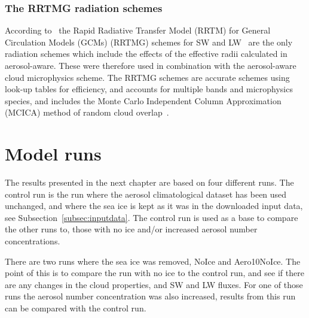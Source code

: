\subsubsection{The RRTMG radiation schemes}
According to~\citet{Thompson2014} the Rapid Radiative Transfer Model (RRTM) for General Circulation Models (GCMs) (RRTMG) schemes for SW and LW~\citep{Mlawer1997, Iacono2000, Iacono2003, Iacono2008} are the only radiation schemes which include the effects of the effective radii calculated in aerosol-aware. These were therefore used in combination with the aerosol-aware cloud microphysics scheme. The RRTMG schemes are accurate schemes using look-up tables for efficiency, and accounts for multiple bands and microphysics species, and includes the Monte Carlo Independent Column Approximation (MCICA) method of random cloud overlap~\citep{Wang2015}.

\section{Model runs}
The results presented in the next chapter are based on four different runs. The control run is the run where the aerosol climatological dataset has been used unchanged, and where the sea ice is kept as it was in the downloaded input data, see Subsection~\ref{subsec:inputdata}. The control run is used as a base to compare the other runs to, those with no ice and/or increased aerosol number concentrations.

There are two runs where the sea ice was removed, NoIce and Aero10NoIce. The point of this is to compare the run with no ice to the control run, and see if there are any changes in the cloud properties, and SW and LW fluxes. For one of those runs the aerosol number concentration was also increased, results from this run can be compared with the control run.

